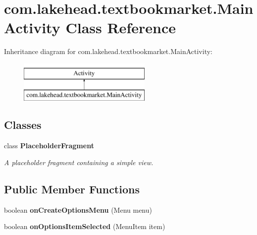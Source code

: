 \hypertarget{classcom_1_1lakehead_1_1textbookmarket_1_1_main_activity}{\section{com.\-lakehead.\-textbookmarket.\-Main\-Activity Class Reference}
\label{classcom_1_1lakehead_1_1textbookmarket_1_1_main_activity}
}
Inheritance diagram for com.\-lakehead.\-textbookmarket.\-Main\-Activity\-:\begin{figure}[H]
\begin{center}
\leavevmode
\includegraphics[height=2.000000cm]{classcom_1_1lakehead_1_1textbookmarket_1_1_main_activity}
\end{center}
\end{figure}
\subsection*{Classes}
\begin{DoxyCompactItemize}
\item 
class {\bfseries Placeholder\-Fragment}
\begin{DoxyCompactList}\small\item\em A placeholder fragment containing a simple view. \end{DoxyCompactList}\end{DoxyCompactItemize}
\subsection*{Public Member Functions}
\begin{DoxyCompactItemize}
\item 
\hypertarget{classcom_1_1lakehead_1_1textbookmarket_1_1_main_activity_a42aad44340fa4dd995cca807512be2bf}{boolean {\bfseries on\-Create\-Options\-Menu} (Menu menu)}\label{classcom_1_1lakehead_1_1textbookmarket_1_1_main_activity_a42aad44340fa4dd995cca807512be2bf}

\item 
\hypertarget{classcom_1_1lakehead_1_1textbookmarket_1_1_main_activity_a9e9ecfdbbbb7ad1d0ecec7ba405701a6}{boolean {\bfseries on\-Options\-Item\-Selected} (Menu\-Item item)}\label{classcom_1_1lakehead_1_1textbookmarket_1_1_main_activity_a9e9ecfdbbbb7ad1d0ecec7ba405701a6}

\end{DoxyCompactItemize}
